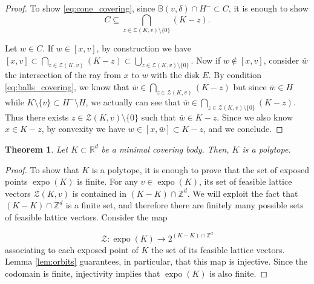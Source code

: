 \documentclass[11pt, a4paper]{amsart}
\newcommand{\orbit}{\mathcal{Z}}
\newcommand{\RR}{\mathbb{R}}
\newcommand{\ZZ}{\mathbb{Z}}
\newcommand{\ball}{\mathbb{B}}
\DeclareMathOperator{\expo}{expo}
\numberwithin{equation}{section}
\theoremstyle{plain}
\newtheorem{theorem}{Theorem}[section]
\begin{document}
\begin{proof}
	To show \eqref{eq:cone_covering}, since $\ball(v, \delta) \cap H^- \subset C$, it is enough to show
	\[
	C\subseteq \bigcap_{z \in \orbit(K,v) \setminus \{0\}} (K-z).
	\]
	

	Let $w \in C$. If $w \in [x,v]$, by construction we have $[x,v] \subset \bigcap_{z \in \orbit(K,v)} (K-z) \subset \bigcup_{z \in \orbit(K,v) \setminus \{0\}}$. Now if $w \notin [x,v]$, consider $\bar{w}$ the intersection of the ray from $x$ to $w$ with the disk $E$. By condition \eqref{eq:balls_covering}, we know that $\bar{w} \in \bigcap_{z \in \orbit(K,v)} (K-z)$ but since $\bar{w} \in H$ while $K \setminus \{v\} \subset H^- \setminus H$, we actually can see that $\bar{w}\in \bigcap_{z \in \orbit(K,v) \setminus \{0\}} (K-z)$. Thus there exists $z \in \orbit(K, v) \setminus \{0\}$ such that $\bar{w} \in K-z$. Since we also know $x \in K-z$, by convexity we have $w \in [x, \bar{w}] \subset K-z$, and we conclude.
\end{proof}

\begin{theorem}
\label{thm:polytopes}
	Let $K\subset\RR^d$ be a minimal covering body. Then, $K$ is a polytope.
\end{theorem}

\begin{proof}
	To show that $K$ is a polytope, it is enough to prove that the set of exposed points $\expo(K)$ is finite. 
	For any $v \in \expo(K)$, its set of feasible lattice vectors $\orbit(K,v)$ is contained in $(K-K) \cap \ZZ^d$. We will exploit the fact that $(K-K) \cap \ZZ^d$ is a finite set, and therefore there are finitely many possible sets of feasible lattice vectors.
	Consider the map 
	
	\[
	\mathcal{Z}: \expo(K) \longrightarrow 2^{(K-K) \cap \ZZ^d}
	\]
	associating to each exposed point of $K$ the set of its feasible lattice vectors. Lemma \ref{lem:orbits} guarantees, in particular, that this map is injective. Since the codomain is finite, injectivity implies that $\expo(K)$ is also finite.
\end{proof}
\end{document}
